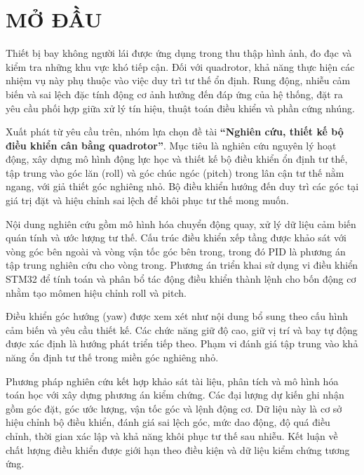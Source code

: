 \chapter*{MỞ ĐẦU}

Thiết bị bay không người lái được ứng dụng trong thu thập hình ảnh, đo đạc và kiểm tra những khu vực khó tiếp cận. Đối với quadrotor, khả năng thực hiện các nhiệm vụ này phụ thuộc vào việc duy trì tư thế ổn định. Rung động, nhiễu cảm biến và sai lệch đặc tính động cơ ảnh hưởng đến đáp ứng của hệ thống, đặt ra yêu cầu phối hợp giữa xử lý tín hiệu, thuật toán điều khiển và phần cứng nhúng.

Xuất phát từ yêu cầu trên, nhóm lựa chọn đề tài \textbf{``Nghiên cứu, thiết kế bộ điều khiển cân bằng quadrotor''}. Mục tiêu là nghiên cứu nguyên lý hoạt động, xây dựng mô hình động lực học và thiết kế bộ điều khiển ổn định tư thế, tập trung vào góc lăn (roll) và góc chúc ngóc (pitch) trong lân cận tư thế nằm ngang, với giả thiết góc nghiêng nhỏ. Bộ điều khiển hướng đến duy trì các góc tại giá trị đặt và hiệu chỉnh sai lệch để khôi phục tư thế mong muốn.

Nội dung nghiên cứu gồm mô hình hóa chuyển động quay, xử lý dữ liệu cảm biến quán tính và ước lượng tư thế. Cấu trúc điều khiển xếp tầng được khảo sát với vòng góc bên ngoài và vòng vận tốc góc bên trong, trong đó PID là phương án tập trung nghiên cứu cho vòng trong. Phương án triển khai sử dụng vi điều khiển STM32 để tính toán và phân bổ tác động điều khiển thành lệnh cho bốn động cơ nhằm tạo mômen hiệu chỉnh roll và pitch.

Điều khiển góc hướng (yaw) được xem xét như nội dung bổ sung theo cấu hình cảm biến và yêu cầu thiết kế. Các chức năng giữ độ cao, giữ vị trí và bay tự động được xác định là hướng phát triển tiếp theo. Phạm vi đánh giá tập trung vào khả năng ổn định tư thế trong miền góc nghiêng nhỏ.

Phương pháp nghiên cứu kết hợp khảo sát tài liệu, phân tích và mô hình hóa toán học với xây dựng phương án kiểm chứng. Các đại lượng dự kiến ghi nhận gồm góc đặt, góc ước lượng, vận tốc góc và lệnh động cơ. Dữ liệu này là cơ sở hiệu chỉnh bộ điều khiển, đánh giá sai lệch góc, mức dao động, độ quá điều chỉnh, thời gian xác lập và khả năng khôi phục tư thế sau nhiễu. Kết luận về chất lượng điều khiển được giới hạn theo điều kiện và dữ liệu kiểm chứng tương ứng.
